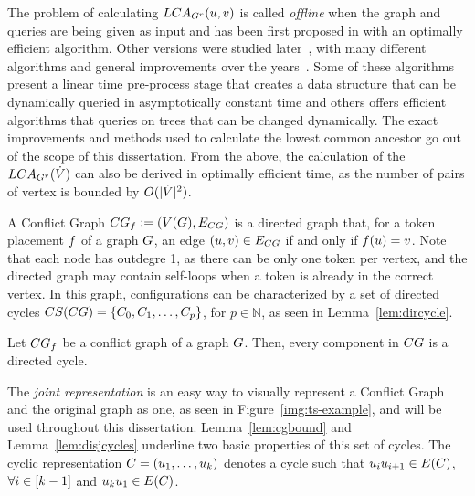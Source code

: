 \documentclass[msc]{ppgccufmg}    %
\begin{document}

The problem of calculating $LCA_{G^{r}}(u, v)$ is called \textit{offline} 
when the graph and queries are being given as input and has been first proposed 
in \citep{Aho:1973} with an optimally efficient algorithm. 
Other versions were studied later~\citep{Harel:1984}, with many different 
algorithms and general improvements over the years~\citep{Alstrup:2004}.
Some of these algorithms present a linear time pre-process stage that creates a 
data structure that can be dynamically queried in asymptotically constant time 
and others offers efficient algorithms that queries on trees that can be changed
dynamically.
The exact improvements and methods used to calculate the lowest common ancestor 
go out of the scope of this dissertation.
From the above, the calculation of the $LCA_{G^{r}}(\dot{V})$ can also be
derived in optimally efficient time, as the number of pairs of vertex is bounded 
by $O(|\dot{V}|^2)$.

A Conflict Graph $CG_{f} \vcentcolon= (V(G), 
E_{CG})$ is a directed graph that, for a token placement 
$f$ of a graph $G$, an edge $(u, v) \in 
E_{CG}$ if and only if $f(u) = v$.
Note that each node has outdegre 1, as there can be only one token per vertex, 
and the directed graph may contain self-loops when a token is already in the
correct vertex.
In this graph, configurations can be characterized by a set of directed 
cycles $CS(CG) = \{C_{0}, 
C_{1}, \ldots, C_{p}\}$, for $p \in \mathbb{N}$, as seen in 
Lemma~\ref{lem:dircycle}.

\begin{lemma}
\label{lem:dircycle}
\citep{Yamanaka:2015}
Let $CG_{f}$ be a conflict graph of a graph $G$.
Then, every component in $CG$ is a directed cycle.
\end{lemma}

The \textit{joint representation} is an easy way to visually represent a Conflict 
Graph and the original graph as one, as seen in Figure~\ref{img:ts-example}, 
and will be used throughout this dissertation.
Lemma~\ref{lem:cgbound} and Lemma~\ref{lem:disjcycles} underline two basic 
properties of this set of cycles.
The cyclic representation $C = (u_{1}, \ldots, u_
{k})$ denotes a cycle such that $u_{i}u_{i+1} \in E(C)$, $\forall i \in [k-1]$ and $u_{k}u_{1} \in 
E(C)$.
\end{document}
